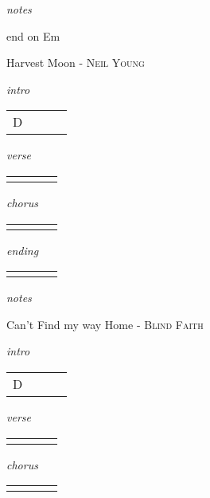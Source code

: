 \documentclass[12pt]{article}
\begin{document}
\textit{notes}

end on Em

\newpage


{\Huge Harvest Moon} {\huge - \textsc{Neil Young}}

\huge
\textit{intro}

\begin{tabular}{|P{1.25in}|P{1.25in}|P{1.25in}|P{1.25in}|}
  D &   &   &   \\
\end{tabular}

\textit{verse}

\begin{tabular}{|P{1.25in}|P{1.25in}|P{1.25in}|P{1.25in}|}
    &   &   &   \\
\end{tabular}

\textit{chorus}

\begin{tabular}{|P{1.25in}|P{1.25in}|P{1.25in}|P{1.25in}|}
    &   &   &   \\
\end{tabular}

\textit{ending}

\begin{tabular}{|P{1.25in}|P{1.25in}|P{1.25in}|P{1.25in}|}
    &   &   &   \\
\end{tabular}

\textit{notes}

\newpage

{\Huge Can't Find my way Home} {\huge - \textsc{Blind Faith}}

\huge
\textit{intro}

\begin{tabular}{|P{1.25in}|P{1.25in}|P{1.25in}|P{1.25in}|}
  D &   &   &   \\
\end{tabular}

\textit{verse}

\begin{tabular}{|P{1.25in}|P{1.25in}|P{1.25in}|P{1.25in}|}
    &   &   &   \\
\end{tabular}

\textit{chorus}

\begin{tabular}{|P{1.25in}|P{1.25in}|P{1.25in}|P{1.25in}|}
    &   &   &   \\
\end{tabular}
\end{document}
